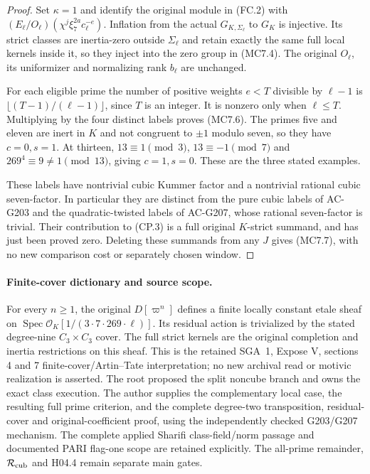 \begin{proof}
Set $\kappa=1$ and identify the original module in (FC.2)
with $(E_\ell/O_\ell)(\chi^j\xi_7^{2a}c_\ell^{-e})$.
Inflation from the actual $G_{K,\Sigma_\ell}$ to $G_K$ is
injective.  Its strict classes are inertia-zero outside
$\Sigma_\ell$ and retain exactly the same full local kernels
inside it, so they inject into the zero group in (MC7.4).
The original $O_\ell$, its uniformizer and normalizing rank
$b_\ell$ are unchanged.

For each eligible prime the number of positive weights
$e<T$ divisible by $\ell-1$ is
$\lfloor(T-1)/(\ell-1)\rfloor$, since $T$ is an integer.
It is nonzero only when $\ell\leq T$.  Multiplying by the
four distinct labels proves (MC7.6).  The primes five and
eleven are inert in $K$ and not congruent to $\pm1$ modulo
seven, so they have $c=0,s=1$.  At thirteen,
$13\equiv1\pmod3$, $13\equiv-1\pmod7$ and
$269^4\equiv9\ne1\pmod{13}$, giving $c=1,s=0$.
These are the three stated examples.

These labels have nontrivial cubic Kummer factor and a
nontrivial rational cubic seven-factor.  In particular they
are distinct from the pure cubic labels of AC-G203 and the
quadratic-twisted labels of AC-G207, whose rational seven-factor
is trivial.  Their contribution to (CP.3) is a full original
$K$-strict summand, and has just been proved zero.  Deleting
these summands from any $J$ gives (MC7.7), with no new
comparison cost or separately chosen window.
\end{proof}

\paragraph{Finite-cover dictionary and source scope.}
For every $n\geq1$, the original $D[\varpi^n]$ defines a
finite locally constant etale sheaf on
$\operatorname{Spec}\mathcal O_K[1/(3\cdot7\cdot269\cdot\ell)]$.
Its residual action is trivialized by the stated degree-nine
$C_3\times C_3$ cover.  The full strict kernels are the
original completion and inertia restrictions on this sheaf.
This is the retained SGA~1, Expose V, sections 4 and 7
finite-cover/Artin--Tate interpretation; no new archival read
or motivic realization is asserted.
The root proposed the split noncube branch and owns the exact
class execution.  The author supplies the complementary local
case, the resulting full prime criterion, and the complete
degree-two transposition, residual-cover and original-coefficient proof,
using the independently checked G203/G207 mechanism.
The complete applied Sharifi class-field/norm passage and
documented PARI flag-one scope are retained explicitly.
The all-prime remainder, $\mathcal R_{\rm cub}$ and H04.4
remain separate main gates.
